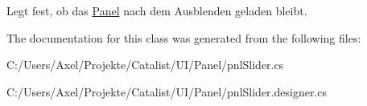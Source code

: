 Legt fest, ob das \hyperlink{namespace_products_1_1_common_1_1_panel}{Panel} nach dem Ausblenden geladen bleibt. 



The documentation for this class was generated from the following files\+:\begin{DoxyCompactItemize}
\item 
C\+:/\+Users/\+Axel/\+Projekte/\+Catalist/\+U\+I/\+Panel/pnl\+Slider.\+cs\item 
C\+:/\+Users/\+Axel/\+Projekte/\+Catalist/\+U\+I/\+Panel/pnl\+Slider.\+designer.\+cs\end{DoxyCompactItemize}
